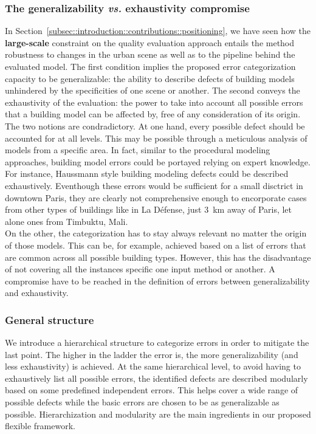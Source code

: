         \subsubsection{The generalizability \textit{vs.} exhaustivity compromise}
            In Section~\ref{subsec::introduction::contributions::positioning}, we have seen how the \textbf{large-scale} constraint on the quality evaluation approach entails the method robustness to changes in the urban scene as well as to the pipeline behind the evaluated model.
            The first condition implies the proposed error categorization capacity to be generalizable: the ability to describe defects of building models unhindered by the specificities of one scene or another.
            The second conveys the exhaustivity of the evaluation: the power to take into account all possible errors that a building model can be affected by, free of any consideration of its origin.\\

            The two notions are condradictory.
            At one hand, every possible defect should be accounted for at all levels.
            This may be possible through a meticulous analysis of models from a specific area.
            In fact, similar to the procedural modeling approaches, building model errors could be portayed relying on expert knowledge.
            For instance, Haussmann style building modeling defects could be described exhaustively.
            Eventhough these errors would be sufficient for a small disctrict in downtown Paris, they are clearly not comprehensive enough to encorporate cases from other types of buildings like in La D\'efense, just \SI{3}{\km} away of Paris, let alone ones from Timbuktu, Mali.\\

            On the other, the categorization has to stay always relevant no matter the origin of those models.
            This can be, for example, achieved based on a list of errors that are common across all possible building types.
            However, this has the disadvantage of not covering all the instances specific one input method or another.
            A compromise have to be reached in the definition of errors between generalizability and exhaustivity.
        
        \subsubsection{General structure}
            We introduce a hierarchical structure to categorize errors in order to mitigate the last point.
            The higher in the ladder the error is, the more generalizability (and less exhaustivity) is achieved.
            At the same hierarchical level, to avoid having to exhaustively list all possible errors, the identified defects are described modularly based on some predefined independent errors.
            This helps cover a wide range of possible defects while the basic errors are chosen to be as generalizable as possible.
            Hierarchization and modularity are the main ingredients in our proposed flexible framework.\\

